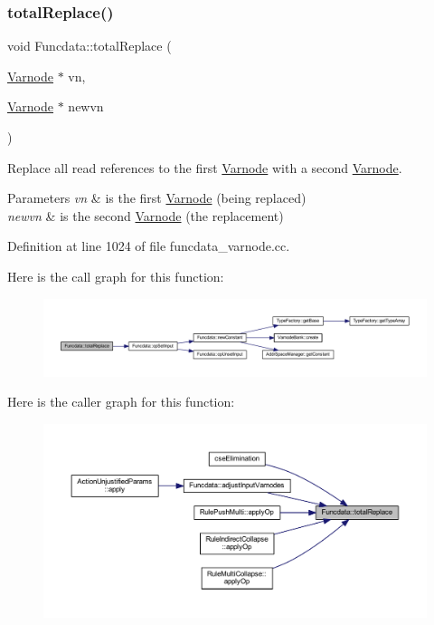 \subsubsection{\texorpdfstring{totalReplace()}{totalReplace()}}
{\footnotesize\ttfamily void Funcdata\+::total\+Replace (\begin{DoxyParamCaption}\item[{\mbox{\hyperlink{class_varnode}{Varnode}} $\ast$}]{vn,  }\item[{\mbox{\hyperlink{class_varnode}{Varnode}} $\ast$}]{newvn }\end{DoxyParamCaption})}



Replace all read references to the first \mbox{\hyperlink{class_varnode}{Varnode}} with a second \mbox{\hyperlink{class_varnode}{Varnode}}. 


\begin{DoxyParams}{Parameters}
{\em vn} & is the first \mbox{\hyperlink{class_varnode}{Varnode}} (being replaced) \\
\hline
{\em newvn} & is the second \mbox{\hyperlink{class_varnode}{Varnode}} (the replacement) \\
\hline
\end{DoxyParams}


Definition at line 1024 of file funcdata\+\_\+varnode.\+cc.

Here is the call graph for this function\+:
\nopagebreak
\begin{figure}[H]
\begin{center}
\leavevmode
\includegraphics[width=350pt]{class_funcdata_aab7f940f85609d395283520eca3a71f0_cgraph}
\end{center}
\end{figure}
Here is the caller graph for this function\+:
\nopagebreak
\begin{figure}[H]
\begin{center}
\leavevmode
\includegraphics[width=350pt]{class_funcdata_aab7f940f85609d395283520eca3a71f0_icgraph}
\end{center}
\end{figure}
\mbox{\label{class_funcdata_a2934e1e4246d41a5e28f6fcb56acc937}} 
